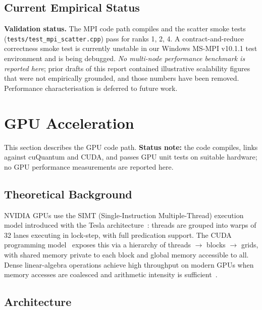 \documentclass[11pt,a4paper]{article}
\begin{document}
\subsection{Current Empirical Status}

\begin{infobox}
\textbf{Validation status.} The MPI code path compiles and the scatter smoke tests
(\texttt{tests/test\_mpi\_scatter.cpp}) pass for ranks 1, 2, 4. A contract-and-reduce
correctness smoke test is currently unstable in our Windows MS-MPI v10.1.1 test
environment and is being debugged. \emph{No multi-node performance benchmark is
reported here}; prior drafts of this report contained illustrative scalability
figures that were not empirically grounded, and those numbers have been removed.
Performance characterisation is deferred to future work.
\end{infobox}

\section{GPU Acceleration}
\label{sec:gpu}

This section describes the GPU code path. \textbf{Status note:} the code compiles,
links against cuQuantum and CUDA, and passes GPU unit tests on suitable hardware;
no GPU performance measurements are reported here.

\subsection{Theoretical Background}

NVIDIA GPUs use the SIMT (Single-Instruction Multiple-Thread) execution model
introduced with the Tesla architecture~\cite{lindholm2008tesla}: threads are grouped
into warps of 32 lanes executing in lock-step, with full predication support.
The CUDA programming model~\cite{nickolls2008cuda} exposes this via a hierarchy of
threads $\to$ blocks $\to$ grids, with shared memory private to each block and global
memory accessible to all. Dense linear-algebra operations achieve high throughput on
modern GPUs when memory accesses are coalesced and arithmetic intensity is
sufficient~\cite{volkovdemmel2008}.

\subsection{Architecture}
\end{document}
